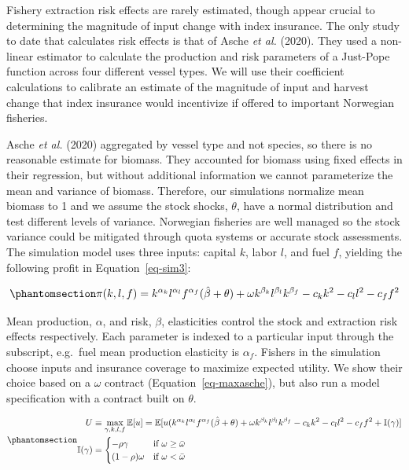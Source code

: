 \documentclass[
  letterpaper,
  DIV=11,
  numbers=noendperiod]{scrartcl}
\theoremstyle{plain}
\theoremstyle{plain}
\theoremstyle{remark}
\begin{document}
Fishery extraction risk effects are rarely estimated, though appear
crucial to determining the magnitude of input change with index
insurance. The only study to date that calculates risk effects is that
of Asche \emph{et al.} (2020). They used a non-linear estimator to
calculate the production and risk parameters of a Just-Pope function
across four different vessel types. We will use their coefficient
calculations to calibrate an estimate of the magnitude of input and
harvest change that index insurance would incentivize if offered to
important Norwegian fisheries.

Asche \emph{et al.} (2020) aggregated by vessel type and not species, so
there is no reasonable estimate for biomass. They accounted for biomass
using fixed effects in their regression, but without additional
information we cannot parameterize the mean and variance of biomass.
Therefore, our simulations normalize mean biomass to 1 and we assume the
stock shocks, \(\theta\), have a normal distribution and test different
levels of variance. Norwegian fisheries are well managed so the stock
variance could be mitigated through quota systems or accurate stock
assessments. The simulation model uses three inputs: capital \(k\),
labor \(l\), and fuel \(f\), yielding the following profit in
Equation~\ref{eq-sim3}:

\begin{equation}\phantomsection\label{eq-sim3}{
\pi(k,l,f)=k^{\alpha_k}l^{\alpha_l}f^{\alpha_f}(\hat\beta+\theta)+\omega k^{\beta_k}l^{\beta_l}k^{\beta_f}-c_kk^2-c_ll^2-c_ff^2
}\end{equation}

Mean production, \(\alpha\), and risk, \(\beta\), elasticities control
the stock and extraction risk effects respectively. Each parameter is
indexed to a particular input through the subscript, e.g.~fuel mean
production elasticity is \(\alpha_f\). Fishers in the simulation choose
inputs and insurance coverage to maximize expected utility. We show
their choice based on a \(\omega\) contract
(Equation~\ref{eq-maxasche}), but also run a model specification with a
contract built on \(\theta\).

\begin{equation}\phantomsection\label{eq-maxasche}{
\begin{aligned}
U&\equiv\max_{\gamma,k,l,f}\mathbb{E}[u]=\mathbb{E}[u(k^{\alpha_k}l^{\alpha_l}f^{\alpha_f}(\hat\beta+\theta)+\omega k^{\beta_k}l^{\beta_l}k^{\beta_f}-c_kk^2-c_ll^2-c_ff^2+\mathbb{I}(\gamma)]\\
\mathbb{I}(\gamma)&=\begin{cases}-\rho\gamma & \text{if } \omega\ge \bar \omega\\
(1-\rho)\omega& \text{if } \omega<\bar \omega
\end{cases}
\end{aligned}
}\end{equation}
\end{document}
